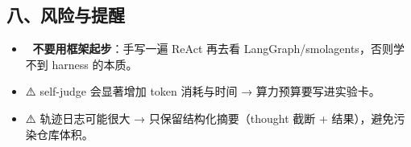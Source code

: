 \documentclass[
  chinese,
  11pt,
]{ctexart}
\providecommand{\tightlist}{%
  \setlength{\itemsep}{0pt}\setlength{\parskip}{0pt}}
\begin{document}
\subsection{八、风险与提醒}\label{ux516bux98ceux9669ux4e0eux63d0ux9192}

\begin{itemize}
\tightlist
\item
  🚨 \textbf{不要用框架起步}：手写一遍 ReAct 再去看 LangGraph/smolagents，否则学不到 harness 的本质。
\item
  ⚠️ self-judge 会显著增加 token 消耗与时间 → 算力预算要写进实验卡。
\item
  ⚠️ 轨迹日志可能很大 → 只保留结构化摘要（thought 截断 + 结果），避免污染仓库体积。
\end{itemize}
\end{document}
